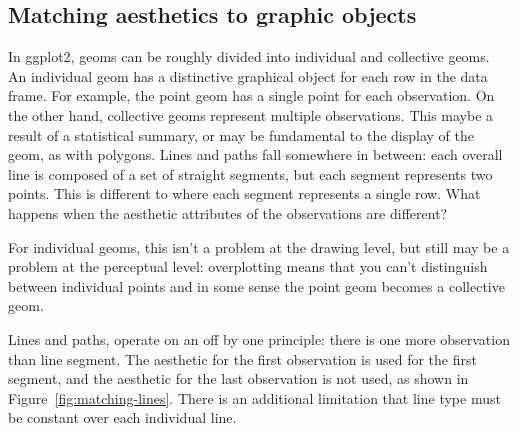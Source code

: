 % 


\subsection{Matching aesthetics to graphic objects}
\label{sub:matching}

In ggplot2, geoms can be roughly divided into individual and collective geoms.  An individual geom has a distinctive graphical object for each row in the data frame.  For example, the point geom has a single point for each observation.  On the other hand, collective geoms represent multiple observations.  This maybe a result of a statistical summary, or may be fundamental to the display of the geom, as with polygons.  Lines and paths fall somewhere in between:  each overall line is composed of a set of straight segments, but each segment represents two points.  This is different to  where each segment represents a single row.  What happens when the aesthetic attributes of the observations are different?


For individual geoms, this isn't a problem at the drawing level, but still may be a problem at the perceptual level: overplotting means that you can't distinguish between individual points and in some sense the point geom becomes a collective geom.

Lines and paths, operate on an off by one principle: there is one more observation than line segment.   The aesthetic for the first observation is used for the first segment, and the aesthetic for the last observation is not used, as shown in Figure~\ref{fig:matching-lines}.  There is an additional limitation that line type must be constant over each individual line.

% 


